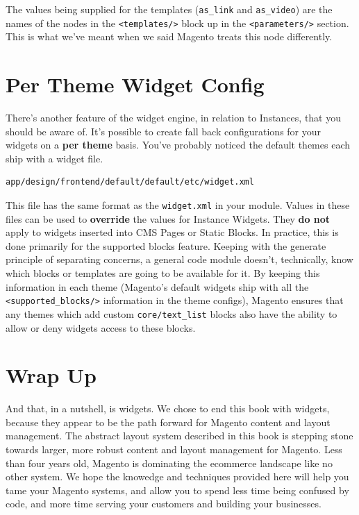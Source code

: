 \documentclass[oneside]{book}
\begin{document}
The values being supplied for the templates (\footnotesize\texttt{as\_link} \normalsize  and \footnotesize\texttt{as\_video}\normalsize) are the names of the nodes in the \footnotesize\texttt{<templates/>} \normalsize  block up in the \footnotesize\texttt{\textless parameters/\textgreater } \normalsize  section.  This is what we've meant when we said Magento treats this node differently.

\section{Per Theme Widget Config}

There's another feature of the widget engine, in relation to Instances, that you should be aware of.  It's possible to create fall back configurations for your widgets on a \textbf{per theme} basis.  You've probably noticed the default themes each ship with a widget file.

\begin{lstlisting}
app/design/frontend/default/default/etc/widget.xml

\end{lstlisting}


This file has the same format as the \footnotesize\texttt{widget.xml} \normalsize  in your module.  Values in these files can be used to \textbf{override} the values for Instance Widgets.  They \textbf{do not} apply to widgets inserted into CMS Pages or Static Blocks.  In practice, this is done primarily for the supported blocks feature.   Keeping with the generate principle of separating concerns, a general code module doesn't, technically, know which blocks or templates are going to be available for it.  By keeping this information in each theme (Magento's default widgets ship with all the \footnotesize\texttt{\textless supported\_blocks/\textgreater } \normalsize  information in the theme configs), Magento ensures that any themes which add custom \footnotesize\texttt{core/text\_list} \normalsize  blocks also have the ability to allow or deny widgets access to these blocks.  

\section{Wrap Up}

And that, in a nutshell, is widgets.  We chose to end this book with widgets, because they appear to be the path forward for Magento content and layout management.  The abstract layout system described in this book is stepping stone towards larger, more robust content and layout management for Magento.  Less than four years old, Magento is dominating the ecommerce landscape like no other system. We hope the knowedge and techniques provided here will help you tame your Magento systems, and allow you to spend less time being confused by code, and more time serving your customers and building your businesses. 
\end{document}
